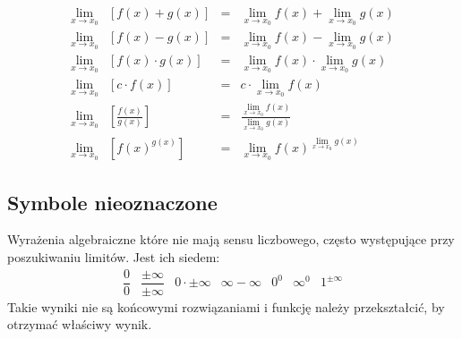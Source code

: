 \documentclass[14pt,a4paper]{extarticle}
\begin{document}
{%

\renewcommand{\arraystretch}{2}

\begin{equation*}
\begin{array}{rccc}
   \displaystyle\lim_{x \to x_{0}} & \displaystyle[f(x) + g(x)] & = & \displaystyle\lim_{x \to x_{0}}f(x) + \lim_{x \to x_{0}}g(x) \\
   \displaystyle\lim_{x \to x_{0}} & \displaystyle[f(x) - g(x)] & = & \displaystyle\lim_{x \to x_{0}}f(x) - \lim_{x \to x_{0}}g(x) \\
   \displaystyle\lim_{x \to x_{0}} & \displaystyle[f(x)\cdot g(x)] & = & \displaystyle\lim_{x \to x_{0}}f(x) \cdot \lim_{x \to x_{0}}g(x) \\
   \displaystyle\lim_{x \to x_{0}} & \displaystyle[c \cdot f(x)] & = & \displaystyle c \cdot \lim_{x \to x_{0}}f(x) \\
   \displaystyle\lim_{x \to x_{0}} & \displaystyle\left[\frac{f(x)}{g(x)}\right] & = & \displaystyle\frac{\displaystyle\lim_{x \to x_{0}}f(x)}{\displaystyle\lim_{x \to x_{0}}g(x)} \\
   \displaystyle\lim_{x \to x_{0}} & \displaystyle [f(x)^{g(x)}]& = & \displaystyle \lim_{x \to x_{0}}f(x)^{\lim\limits_{x \to x_{0}}g(x)}
\end{array}   
\end{equation*}

}%

\subsection{Symbole nieoznaczone}
\noindent Wyrażenia algebraiczne które nie mają sensu liczbowego, często występujące przy poszukiwaniu limitów.
Jest ich siedem:
\begin{equation*}
   \begin{array}{ccccccc}
      \dfrac{0}{0} & \dfrac{\pm\infty}{\pm\infty} & 0 \cdot \pm\infty & \infty - \infty & 0^{0} & \infty^{0} & 1^{\pm\infty}
   \end{array}
\end{equation*}
Takie wyniki nie są końcowymi rozwiązaniami i funkcję należy przekształcić, by otrzymać właściwy wynik.
\end{document}
